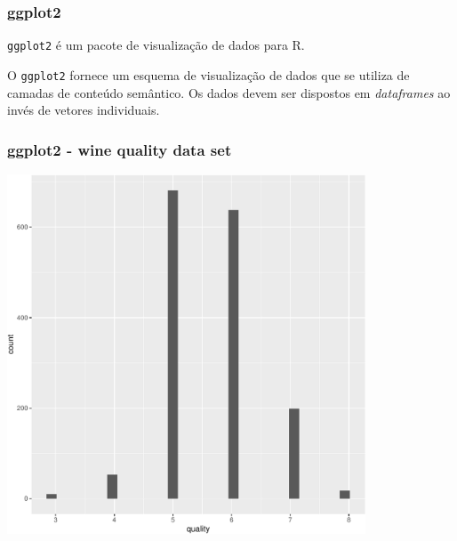 \begin{frame}
\frametitle{ggplot2}
\texttt{ggplot2} é um pacote de visualização de dados para R.

\vspace{3ex}
O \texttt{ggplot2} fornece um esquema de visualização de dados que se
utiliza de camadas de conteúdo semântico. Os dados devem ser dispostos em \emph{dataframes} 
ao invés de vetores individuais.

\end{frame}

\begin{frame}
\frametitle{ggplot2 - wine quality data set}
\centering



\framebreak
 

\framebreak
 

\framebreak
 
\includegraphics[width=0.8\textwidth,height=0.7\textheight,keepaspectratio]{examples/ex-ggplot-01-crop.pdf}


\end{frame}

